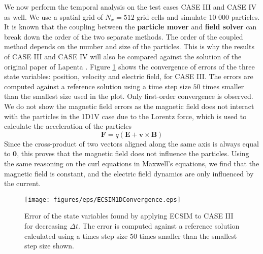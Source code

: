 We now perform the temporal analysis on the test cases CASE III and CASE IV as well. We use a spatial grid of $N_x = 512$ grid cells and simulate 10 000 particles. 
It is known that the coupling between the \textbf{particle mover} and \textbf{field solver} can break down the order of the two separate methods. The order of the coupled method depends on the number and size of the particles. This is why the results of CASE III and CASE IV will also be compared against the solution of the original paper of Lapenta \cite{lapenta_exactly_2017}. Figure \ref{fig: 1D-1V-convergence} shows the convergence of errors of the three state variables: position, velocity and electric field, for CASE III. The errors are computed against a reference solution using a time step size $50$ times smaller than the smallest size used in the plot. Only first-order convergence is observed. We do not show the magnetic field errors as the magnetic field does not interact with the particles in the 1D1V case due to the Lorentz force, which is used to calculate the acceleration of the particles
\[\textbf{F} = q\left(\textbf{E} + \textbf{v} \times \textbf{B}\right)\]
Since the cross-product of two vectors aligned along the same axis is always equal to $\textbf{0}$, this proves that the magnetic field does not influence the particles. Using the same reasoning on the curl equations in Maxwell's equations, we find that the magnetic field is constant, and the electric field dynamics are only influenced by the current. 
\begin{figure}[h]
    \centering
    \texttt{[image: figures/eps/ECSIM1DConvergence.eps]}
    \caption{Error of the state variables found by applying ECSIM to CASE III for decreasing $\Delta t$. The error is computed against a reference solution calculated using a times step size 50 times smaller than the smallest step size shown.}
    \label{fig: 1D-1V-convergence}
\end{figure}
